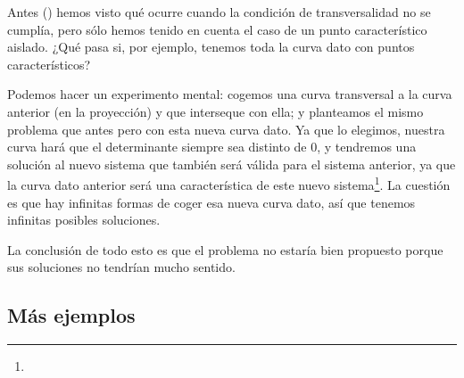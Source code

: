 Antes () hemos visto qué ocurre cuando la condición de transversalidad no se cumplía, pero sólo hemos tenido en cuenta el caso de un punto característico aislado. ¿Qué pasa si, por ejemplo, tenemos toda la curva dato con puntos característicos?

Podemos hacer un experimento mental: cogemos una curva transversal a la curva anterior (en la proyección) y que interseque con ella; y planteamos el mismo problema que antes pero con esta nueva curva dato. Ya que lo elegimos, nuestra curva hará que el determinante siempre sea distinto de 0, y tendremos una solución al nuevo sistema que también será válida para el sistema anterior, ya que la curva dato anterior será una característica de este nuevo sistema\footnote{}. La cuestión es que hay infinitas formas de coger esa nueva curva dato, así que tenemos infinitas posibles soluciones.

La conclusión de todo esto es que el problema no estaría bien propuesto porque sus soluciones no tendrían mucho sentido.

\subsection{Más ejemplos}

